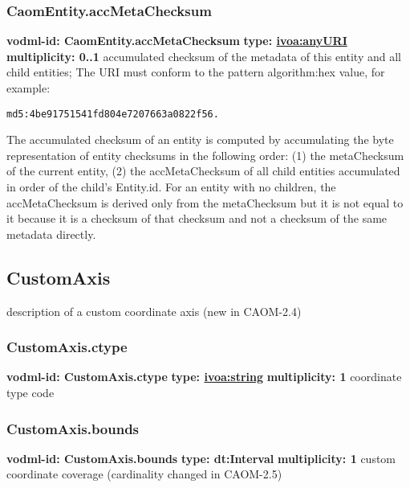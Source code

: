     \subsubsection{CaomEntity.accMetaChecksum}
      \textbf{vodml-id: CaomEntity.accMetaChecksum} \newline
      \textbf{type: \hyperref[sect:ivoa]{ivoa:anyURI}} \newline
      \textbf{multiplicity: 0..1} \newline
      accumulated checksum of the metadata of this entity and all child entities; The URI must conform to the pattern {algorithm}:{hex value}, for example: \begin{verbatim}md5:4be91751541fd804e7207663a0822f56.\end{verbatim} The accumulated checksum of an entity is computed by accumulating the byte representation of entity checksums in the following order: (1) the metaChecksum of the current entity, (2) the accMetaChecksum of all child entities accumulated in order of the child's Entity.id. For an entity with no children, the accMetaChecksum is derived only from the metaChecksum but it is not equal to it because it is a checksum of that checksum and not a checksum of the same metadata directly.

  \subsection{CustomAxis}
  \label{sect:CustomAxis}
    description of a custom coordinate axis (new in CAOM-2.4)

    \subsubsection{CustomAxis.ctype}
      \textbf{vodml-id: CustomAxis.ctype} \newline
      \textbf{type: \hyperref[sect:ivoa]{ivoa:string}} \newline
      \textbf{multiplicity: 1} \newline
      coordinate type code

    \subsubsection{CustomAxis.bounds}
      \textbf{vodml-id: CustomAxis.bounds} \newline
      \textbf{type: dt:Interval} \newline
      \textbf{multiplicity: 1} \newline
      custom coordinate coverage (cardinality changed in CAOM-2.5)

